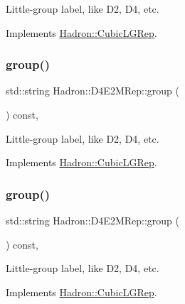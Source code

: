 Little-\/group label, like D2, D4, etc. 

Implements \mbox{\hyperlink{structHadron_1_1CubicLGRep_a9bdb14b519a611d21379ed96a3a9eb41}{Hadron\+::\+Cubic\+L\+G\+Rep}}.

\mbox{\label{structHadron_1_1D4E2MRep_ac61a62d44384cf423d191db25dc0bc62}} 
\subsubsection{\texorpdfstring{group()}{group()}\hspace{0.1cm}{\footnotesize\ttfamily [2/3]}}
{\footnotesize\ttfamily std\+::string Hadron\+::\+D4\+E2\+M\+Rep\+::group (\begin{DoxyParamCaption}{ }\end{DoxyParamCaption}) const\hspace{0.3cm}{\ttfamily [inline]}, {\ttfamily [virtual]}}

Little-\/group label, like D2, D4, etc. 

Implements \mbox{\hyperlink{structHadron_1_1CubicLGRep_a9bdb14b519a611d21379ed96a3a9eb41}{Hadron\+::\+Cubic\+L\+G\+Rep}}.

\mbox{\label{structHadron_1_1D4E2MRep_ac61a62d44384cf423d191db25dc0bc62}} 
\subsubsection{\texorpdfstring{group()}{group()}\hspace{0.1cm}{\footnotesize\ttfamily [3/3]}}
{\footnotesize\ttfamily std\+::string Hadron\+::\+D4\+E2\+M\+Rep\+::group (\begin{DoxyParamCaption}{ }\end{DoxyParamCaption}) const\hspace{0.3cm}{\ttfamily [inline]}, {\ttfamily [virtual]}}

Little-\/group label, like D2, D4, etc. 

Implements \mbox{\hyperlink{structHadron_1_1CubicLGRep_a9bdb14b519a611d21379ed96a3a9eb41}{Hadron\+::\+Cubic\+L\+G\+Rep}}.

\mbox{\label{structHadron_1_1D4E2MRep_a51e2bdc02ee47b919e001f352e2b7297}} 
